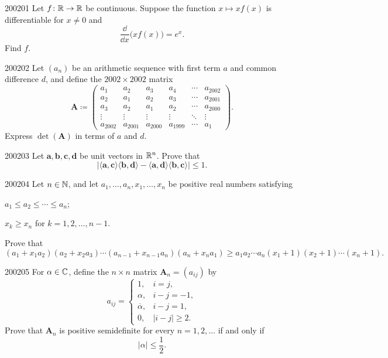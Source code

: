 
\begin{problem}{2002}{0}{1}
Let $f\colon\mathbb{R}\to\mathbb{R}$ be continuous. Suppose the function $x\mapsto xf(x)$ is differentiable for $x\ne0$ and
\[
    \frac{\dd}{\dd x}\bigl(xf(x)\bigr)=e^x.
\]
Find $f$.
\end{problem}

\begin{problem}{2002}{0}{2}
Let $(a_n)$ be an arithmetic sequence with first term $a$ and common difference $d$, and define the $2002\times2002$ matrix
\[
    \mathbf A\coloneqq
    \begin{pmatrix}
        a_1 & a_2 & a_3 & a_4 & \cdots & a_{2002}\\
        a_2 & a_1 & a_2 & a_3 & \cdots & a_{2001}\\
        a_3 & a_2 & a_1 & a_2 & \cdots & a_{2000}\\
        \vdots & \vdots & \vdots & \vdots & \ddots & \vdots\\
        a_{2002} & a_{2001} & a_{2000} & a_{1999} & \cdots & a_1
    \end{pmatrix}.
\]
Express $\det(\mathbf A)$ in terms of $a$ and $d$.
\end{problem}

\begin{problem}{2002}{0}{3}
Let $\mathbf a, \mathbf b, \mathbf c, \mathbf d$ be unit vectors in $\mathbb{R}^n$. Prove that
\[
    \left|
        \langle\mathbf a, \mathbf c\rangle
        \langle\mathbf b, \mathbf d\rangle
        -
        \langle\mathbf a, \mathbf d\rangle
        \langle\mathbf b, \mathbf c\rangle
    \right|
    \le1.
\]
\end{problem}

\begin{problem}{2002}{0}{4}
Let $n\in\mathbb{N}$, and let $a_1, \dots, a_n, x_1, \dots, x_n$ be positive real numbers satisfying
\begin{problemclauses}
    \item $a_1\le a_2\le\cdots\le a_n$;
    \item $x_k\ge x_n$ for $k=1, 2, \dots, n-1$.
\end{problemclauses}
Prove that
\[
    (a_1+x_1a_2)(a_2+x_2a_3)\cdots
    (a_{n-1}+x_{n-1}a_n)(a_n+x_na_1)
    \ge
    a_1a_2\cdots a_n
    (x_1+1)(x_2+1)\cdots(x_n+1).
\]
\end{problem}

\begin{problem}{2002}{0}{5}
For $\alpha\in\mathbb{C}$, define the $n\times n$ matrix $\mathbf A_n=(a_{ij})$ by
\[
    a_{ij}
    =
    \begin{cases}
        1, & i=j, \\
        \alpha, & i-j=-1, \\
        \overline{\alpha}, & i-j=1, \\
        0, & |i-j|\ge2.
    \end{cases}
\]
Prove that $\mathbf A_n$ is positive semidefinite for every $n=1, 2, \dots$ if and only if
\[
    |\alpha|\le\frac12.
\]
\end{problem}

